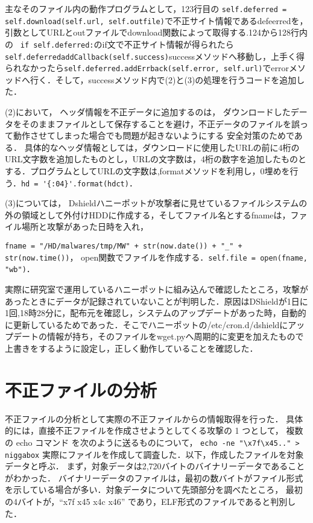 \documentclass[dvipdfmx]{bta}
\begin{document}
主なそのファイル内の動作プログラムとして，123行目の
\verb!self.deferred = self.download(self.url, self.outfile)!で不正サイト情報であるdefeerredを，引数としてURLとoutファイルでdownload関数によって取得する.124から128行内の
\verb! if self.deferred:!のif文で不正サイト情報が得られたら\verb!self.deferredaddCallback(self.success)!successメソッドへ移動し，上手く得られなかったら\verb!self.deferred.addErrback(self.error, self.url)!でerrorメソッドへ行く．そして，successメソッド内で(2)と(3)の処理を行うコードを追加した．

(2)において，
ヘッダ情報を不正データに追加するのは，
ダウンロードしたデータをそのままファイルとして保存することを避け，不正データのファイルを誤って動作させてしまった場合でも問題が起きないようにする
安全対策のためである．
具体的なヘッダ情報としては，ダウンロードに使用したURLの前に4桁のURL文字数を追加したものとし，URLの文字数は，4桁の数字を追加したものとする．プログラムとしてURLの文字数は,formatメソッドを利用し，0埋めを行う．\verb!hd = '{:04}'.format(hdct)!．

(3)については，
Dshieldハニーポットが攻撃者に見せているファイルシステムの外の領域として外付けHDDに作成する，そしてファイル名とするfnameは，ファイル場所と攻撃があった日時を入れ，

\verb!fname = "/HD/malwares/tmp/MW" + str(now.date()) + "_" + str(now.time())!，
open関数でファイルを作成する．\verb!self.file = open(fname, "wb")!．

実際に研究室で運用しているハニーポットに組み込んで確認したところ，攻撃があったときにデータが記録されていないことが判明した．原因はDShieldが1日に1回,18時28分に，配布元を確認し，システムのアップデートがあった時，自動的に更新しているためであった．そこでハニーポットの/etc/cron.d/dshieldにアップデートの情報が持ち，そのファイルをwget.pyへ周期的に変更を加えたもので上書きをするように設定し，正しく動作していることを確認した．

\chapter{不正ファイルの分析}
不正ファイルの分析として実際の不正ファイルからの情報取得を行った．
具体的には，直接不正ファイルを作成させようとしてくる攻撃の 1 つとして，
複数の echo コマンド を次のように送るものについて，
\verb!echo -ne "\x7f\x45.." > niggabox!
実際にファイルを作成して調査した．以下，作成したファイルを対象データと呼ぶ． 
まず，対象データは2,720バイトのバイナリーデータであることがわかった．
バイナリーデータのファイルは，最初の数バイトがファイル形式を示している場合が多い．対象データについて先頭部分を調べたところ，
最初の4バイトが，“x7f x45 x4c x46” であり，ELF形式\cite{elf}のファイルであると判別した．
\end{document}
